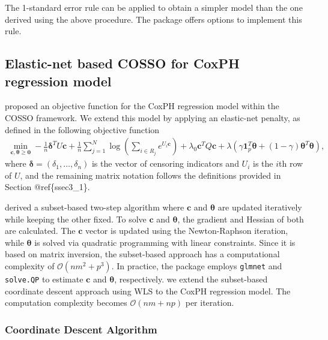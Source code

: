 The 1-standard error rule can be applied to obtain a simpler model than the one derived using the above procedure. The  package offers options to implement this rule.

\hypertarget{ssec3_3}{%
\subsection{Elastic-net based COSSO for CoxPH regression model}\label{ssec3_3}}

\citet{Leng:2006} proposed an objective function for the CoxPH regression model within the COSSO framework. We extend this model by applying an elastic-net penalty, as defined in the following objective function
\begin{align}
    \min_{\pmb{c}, \pmb{\theta} \geq \pmb{0}}
    -\frac{1}{n}\pmb{\delta}^T U\pmb{c} + \frac{1}{n} \sum_{j=1}^{N} \log \left( \sum_{i \in R_j} e^{U_i \pmb{c}} \right) 
    + \lambda_0 \pmb{c}^T Q \pmb{c} 
    + \lambda (\gamma \pmb{1}_p^T \pmb{\theta} + (1-\gamma) \pmb{\theta}^T \pmb{\theta}),
    \label{eq:coxcosso} 
\end{align}
where \(\pmb{\delta} = (\delta_1, \dots, \delta_n)\) is the vector of censoring indicators and \(U_i\) is the \(i\)th row of \(U\), and the remaining matrix notation follows the definitions provided in Section @ref\{ssec3\_1\}.

\citet{Leng:2006} derived a subset-based two-step algorithm where \(\pmb{c}\) and \(\pmb{\theta}\) are updated iteratively while keeping the other fixed. To solve \(\pmb{c}\) and \(\pmb{\theta}\), the gradient and Hessian of both are calculated. The \(\pmb{c}\) vector is updated using the Newton-Raphson iteration, while \(\pmb{\theta}\) is solved via quadratic programming with linear constraints. Since it is based on matrix inversion, the subset-based approach has a computational complexity of \(\mathcal{O}(nm^2 + p^3)\). In practice, the  package employs \texttt{glmnet} and \texttt{solve.QP} to estimate \(\pmb{c}\) and \(\pmb{\theta}\), respectively. we extend the subset-based coordinate descent approach using WLS \citet{Simon:2011} to the CoxPH regression model. The computation complexity becomes \(\mathcal{O}(nm+np)\) per iteration.

\hypertarget{coordinate-descent-algorithm-1}{%
\subsubsection{Coordinate Descent Algorithm}\label{coordinate-descent-algorithm-1}}

